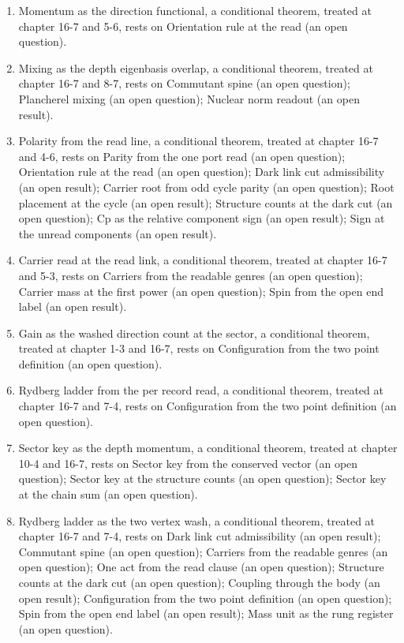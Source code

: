 \begin{enumerate}
\item Momentum as the direction functional, a conditional theorem, treated at chapter 16-7 and 5-6, rests on Orientation rule at the read (an open question).
\item Mixing as the depth eigenbasis overlap, a conditional theorem, treated at chapter 16-7 and 8-7, rests on Commutant spine (an open question); Plancherel mixing (an open question); Nuclear norm readout (an open result).
\item Polarity from the read line, a conditional theorem, treated at chapter 16-7 and 4-6, rests on Parity from the one port read (an open question); Orientation rule at the read (an open question); Dark link cut admissibility (an open result); Carrier root from odd cycle parity (an open question); Root placement at the cycle (an open result); Structure counts at the dark cut (an open question); Cp as the relative component sign (an open result); Sign at the unread components (an open result).
\item Carrier read at the read link, a conditional theorem, treated at chapter 16-7 and 5-3, rests on Carriers from the readable genres (an open question); Carrier mass at the first power (an open question); Spin from the open end label (an open result).
\item Gain as the washed direction count at the sector, a conditional theorem, treated at chapter 1-3 and 16-7, rests on Configuration from the two point definition (an open question).
\item Rydberg ladder from the per record read, a conditional theorem, treated at chapter 16-7 and 7-4, rests on Configuration from the two point definition (an open question).
\item Sector key as the depth momentum, a conditional theorem, treated at chapter 10-4 and 16-7, rests on Sector key from the conserved vector (an open question); Sector key at the structure counts (an open question); Sector key at the chain sum (an open question).
\item Rydberg ladder as the two vertex wash, a conditional theorem, treated at chapter 16-7 and 7-4, rests on Dark link cut admissibility (an open result); Commutant spine (an open question); Carriers from the readable genres (an open question); One act from the read clause (an open question); Structure counts at the dark cut (an open question); Coupling through the body (an open result); Configuration from the two point definition (an open question); Spin from the open end label (an open result); Mass unit as the rung register (an open question).

\end{enumerate}
